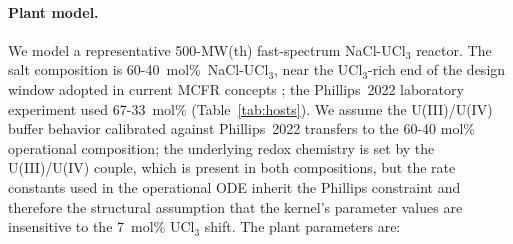 \documentclass[11pt]{article}
\theoremstyle{plain}
\theoremstyle{definition}
\theoremstyle{remark}
\begin{document}
\paragraph{Plant model.}
We model a representative 500-MW(th) fast-spectrum NaCl-UCl$_3$ reactor.
The salt composition is 60-40~mol\%~NaCl-UCl$_3$, near the UCl$_3$-rich end
of the design window adopted in current MCFR concepts
\citep{Phillips2022,TerraPower2021,TerraPower2021}; the Phillips~2022
laboratory experiment used 67-33~mol\% (Table~\ref{tab:hosts}).  We assume
the U(III)/U(IV) buffer behavior calibrated against Phillips~2022 transfers
to the 60-40 mol\% operational composition; the underlying redox chemistry
is set by the U(III)/U(IV) couple, which is present in both compositions,
but the rate constants used in the operational ODE inherit the Phillips
constraint and therefore the structural assumption that the kernel's
parameter values are insensitive to the 7~mol\% UCl$_3$ shift.  The plant
parameters are:
\end{document}
